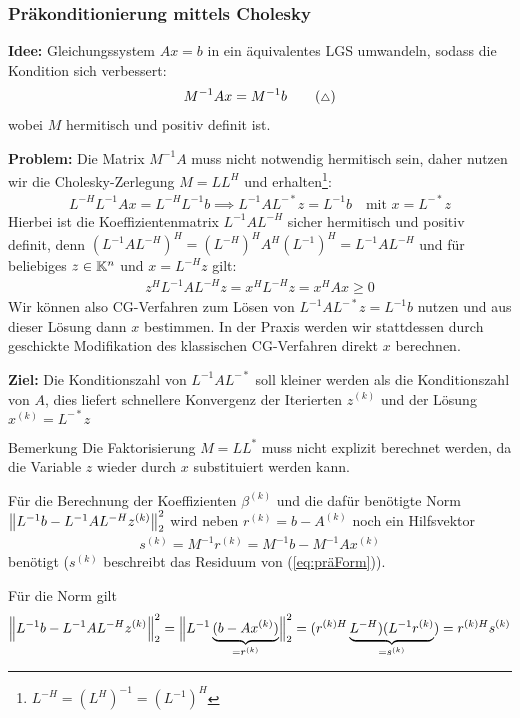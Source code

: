 \subsubsection{Präkonditionierung mittels Cholesky}
\textbf{Idee:} 
Gleichungssystem $Ax=b$ in ein äquivalentes LGS umwandeln, sodass die Kondition sich verbessert: 
  \begin{align*}
    M^{-1}Ax = M^{-1}b  \tag{{\scriptsize$\triangle$}} \label{eq:präForm}
  \end{align*}
wobei $M$ hermitisch und positiv definit ist. 

\textbf{Problem:} 
Die Matrix $M^{-1}A$ muss nicht notwendig hermitisch sein, daher nutzen wir die 
Cholesky-Zerlegung $M=LL^H$
und erhalten\footnote{$L^{-H} = (L^H)^{-1} = (L^{-1})^H$}: 
%
\begin{align*}
  L^{-H}L^{-1}Ax = L^{-H}L^{-1}b \implies L^{-1}AL^{-*}z = L^{-1}b \quad \text{mit } x = L^{-*}z
\end{align*}
%
Hierbei ist die Koeffizientenmatrix $L^{-1}AL^{-H}$ sicher hermitisch und positiv definit, 
denn $(L^{-1}AL^{-H})^H = (L^{-H})^HA^H(L^{-1})^H = L^{-1}AL^{-H}$ und für beliebiges 
$z\in\mathbb K^n$ und $x=L^{-H}z$ gilt: 
%
\begin{align*}
  z^HL^{-1}AL^{-H}z 
  = x^HL^{-H}z 
  = x^HAx \geq 0
\end{align*}
%
Wir können also CG-Verfahren zum Lösen von $L^{-1}AL^{-*}z = L^{-1}b$ nutzen und aus dieser Lösung 
dann $x$ bestimmen. In der Praxis werden wir stattdessen durch geschickte Modifikation des klassischen 
CG-Verfahren direkt $x$ berechnen.

\textbf{Ziel:} Die Konditionszahl von $L^{-1}AL^{-*}$ soll kleiner werden als die Konditionszahl von $A$, dies 
liefert schnellere Konvergenz der Iterierten $z^{(k)}$ und der Lösung $x^{(k)}=L^{-*}z$ 

\begin{colbox}{Bemerkung}
  Die Faktorisierung $M=LL^*$ muss nicht explizit berechnet werden, 
  da die Variable $z$ wieder durch $x$ substituiert werden kann.

  Für die Berechnung der Koeffizienten $\beta^{(k)}$ und die dafür benötigte Norm 
  $\vertn{2}{L^{-1}b-L^{-1}AL^{-H}z^{(k)}}_2^2$ wird neben $r^{(k)} = b-A^{(k)}$ noch ein Hilfsvektor 
  \begin{align*}
    s^{(k)} = M^{-1}r^{(k)} = M^{-1}b - M^{-1}Ax^{(k)}
  \end{align*}
  benötigt ($s^{(k)}$ beschreibt das Residuum von (\ref{eq:präForm})).
  
  Für die Norm gilt 
  \begin{align*}
    \vertn{2}{L^{-1}b-L^{-1}AL^{-H}z^{(k)}}_2^2 
    = \Big\|{L^{-1}\underbrace{(b-Ax^{(k)})}_{=r^{(k)}}}\Big\|_2^2
    = ({r^{(k)H}}\underbrace{L^{-H})(L^{-1}r^{(k)}}_{=s^{(k)}}) 
    = {r^{(k)H}}s^{(k)}
  \end{align*}
\end{colbox}

